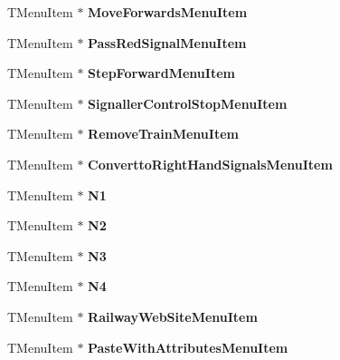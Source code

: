 \begin{DoxyCompactItemize}
T\+Menu\+Item $\ast$ {\bfseries Move\+Forwards\+Menu\+Item}
\item 
\mbox{\label{class_t_interface_ad807d344c8793fa5440e5f0d1e2eeed6}} 
T\+Menu\+Item $\ast$ {\bfseries Pass\+Red\+Signal\+Menu\+Item}
\item 
\mbox{\label{class_t_interface_a1334c491f0254679207838eb0f457bd5}} 
T\+Menu\+Item $\ast$ {\bfseries Step\+Forward\+Menu\+Item}
\item 
\mbox{\label{class_t_interface_ad296d1d02641e6ab1c736a5feefc0aea}} 
T\+Menu\+Item $\ast$ {\bfseries Signaller\+Control\+Stop\+Menu\+Item}
\item 
\mbox{\label{class_t_interface_a5471ec6f1a7b0b956c9faa1c6c30b672}} 
T\+Menu\+Item $\ast$ {\bfseries Remove\+Train\+Menu\+Item}
\item 
\mbox{\label{class_t_interface_a88e01171a78401279613c8bd96c7205e}} 
T\+Menu\+Item $\ast$ {\bfseries Convertto\+Right\+Hand\+Signals\+Menu\+Item}
\item 
\mbox{\label{class_t_interface_a424b363a104a95f4822dd16de1097ede}} 
T\+Menu\+Item $\ast$ {\bfseries N1}
\item 
\mbox{\label{class_t_interface_aa8e2cca943dae09344c978022b88dd2b}} 
T\+Menu\+Item $\ast$ {\bfseries N2}
\item 
\mbox{\label{class_t_interface_a1b5a32294b339476a9af8f269ed9194f}} 
T\+Menu\+Item $\ast$ {\bfseries N3}
\item 
\mbox{\label{class_t_interface_aabd2fb3d290688c7ae53589d44e02467}} 
T\+Menu\+Item $\ast$ {\bfseries N4}
\item 
\mbox{\label{class_t_interface_aa576dc5d61c896895f249cdf8d7ccfc5}} 
T\+Menu\+Item $\ast$ {\bfseries Railway\+Web\+Site\+Menu\+Item}
\item 
\mbox{\label{class_t_interface_a039a43bfeefcbc4dcdf273c24f1140a1}} 
T\+Menu\+Item $\ast$ {\bfseries Paste\+With\+Attributes\+Menu\+Item}

\end{DoxyCompactItemize}
